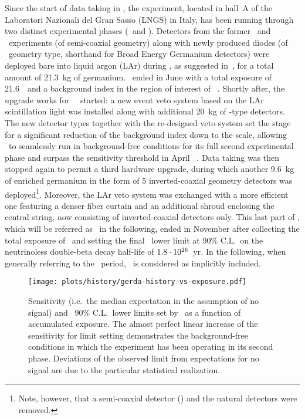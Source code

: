 Since the start of data taking in , the experiment, located in hall~A of the
Laboratori Nazionali del Gran Sasso (LNGS) in Italy, has been running through two distinct
experimental phases (\phaseone\ and \phasetwo). Detectors from the former \hdm\ and \igex\
experiments (of semi-coaxial geometry) along with newly produced diodes (of \bege\
geometry type, shorthand for Broad Energy Germanium detectors) were deployed bare into
liquid argon (LAr) during \phaseone, as suggested in~\cite{Heusser1995},
for a total amount of 21.3~kg of germanium. \phaseone\ ended in June \yr{2013} with a total
exposure of 21.6~\kgyr\ and a background index in the region of interest of
\pIbi~\cite{Agostini2016}.  Shortly after, the upgrade works for \gerda\ \phasetwo\ started:
a new event veto system based on the LAr scintillation light was installed along with
additional 20~kg of \bege-type detectors.  The new detector types together with the
re-designed veto system set the stage for a significant reduction of the background index
down to the \powctsper{-4} scale, allowing \gerda\ to seamlessly run in background-free
conditions for its full second experimental phase and surpass the \powtenyr{26}
sensitivity threshold in April \yr{2018}~\cite{Agostini2019a}.  Data taking was then
stopped again to permit a third hardware upgrade, during which another 9.6~kg of enriched
germanium in the form of 5 inverted-coaxial geometry detectors was
deployed\footnote{Note, however, that a semi-coaxial detector (\ANG{1}) and the natural
\GTF{} detectors were removed.}. Moreover, the LAr veto system was exchanged with a more
efficient one featuring a denser fiber curtain and an additional shroud enclosing the
central string, now consisting of inverted-coaxial detectors only. This last part of
\phasetwo, which will be referred as \phasetwop\ in the following, ended in November
\yr{2019} after collecting the total exposure of \gexpo\ and setting the final \gerda\
lower limit at 90\% C.L.~on the neutrinoless double-beta decay half-life of
$1.8 \cdot 10^{26}$~yr. In the following, when generally referring to the \phasetwo\ period,
\phasetwop\ is considered as implicitly included.
\begin{figure}
  \centering
  \texttt{[image: plots/history/gerda-history-vs-exposure.pdf]}
  \caption{%
    Sensitivity (i.e.~the median expectation in the assumption of no signal) and
    \thalfzero\ 90\% C.L.~lower limits set by \gerda\ as a function of accumulated
    exposure. The almost perfect linear increase of the sensitivity for limit setting
    demonstrates the background-free conditions in which the experiment has been operating
    in its second phase. Deviations of the observed limit from expectations for no signal
    are due to the particular statistical realization.
  }\label{fig:exp:gerda-history}
\end{figure}
